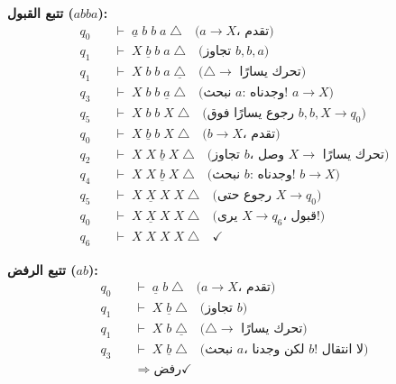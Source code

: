 \documentclass[14pt]{extarticle}
\begin{document}
\textbf{تتبع القبول ($abba$):}
\begin{align*}
q_0 \quad &\vdash \; \underline{a} \; b \; b \; a \; \triangle
    \quad \text{($a \to X$، تقدم)} \\
q_1 \quad &\vdash \; X \; \underline{b} \; b \; a \; \triangle
    \quad \text{(تجاوز $b, b, a$)} \\
q_1 \quad &\vdash \; X \; b \; b \; a \; \underline{\triangle}
    \quad \text{($\triangle \to$ تحرك يسارًا)} \\
q_3 \quad &\vdash \; X \; b \; b \; \underline{a} \; \triangle
    \quad \text{(نبحث $a$: وجدناه! $a \to X$)} \\
q_5 \quad &\vdash \; X \; b \; b \; X \; \triangle
    \quad \text{(رجوع يسارًا فوق $b, b, X \to q_0$)} \\
q_0 \quad &\vdash \; X \; \underline{b} \; b \; X \; \triangle
    \quad \text{($b \to X$، تقدم)} \\
q_2 \quad &\vdash \; X \; X \; \underline{b} \; X \; \triangle
    \quad \text{(تجاوز $b$، وصل $X \to$ تحرك يسارًا)} \\
q_4 \quad &\vdash \; X \; X \; \underline{b} \; X \; \triangle
    \quad \text{(نبحث $b$: وجدناه! $b \to X$)} \\
q_5 \quad &\vdash \; X \; \underline{X} \; X \; X \; \triangle
    \quad \text{(رجوع حتى $X \to q_0$)} \\
q_0 \quad &\vdash \; X \; \underline{X} \; X \; X \; \triangle
    \quad \text{(يرى $X \to q_6$، قبول!)} \\
q_6 \quad &\vdash \; X \; X \; X \; X \; \triangle \quad \checkmark
\end{align*}

\textbf{تتبع الرفض ($ab$):}
\begin{align*}
q_0 \quad &\vdash \; \underline{a} \; b \; \triangle
    \quad \text{($a \to X$، تقدم)} \\
q_1 \quad &\vdash \; X \; \underline{b} \; \triangle
    \quad \text{(تجاوز $b$)} \\
q_1 \quad &\vdash \; X \; b \; \underline{\triangle}
    \quad \text{($\triangle \to$ تحرك يسارًا)} \\
q_3 \quad &\vdash \; X \; \underline{b} \; \triangle
    \quad \text{(نبحث $a$، لكن وجدنا $b$! لا انتقال)} \\
&\Rightarrow \textbf{رفض} \checkmark
\end{align*}

\end{document}
